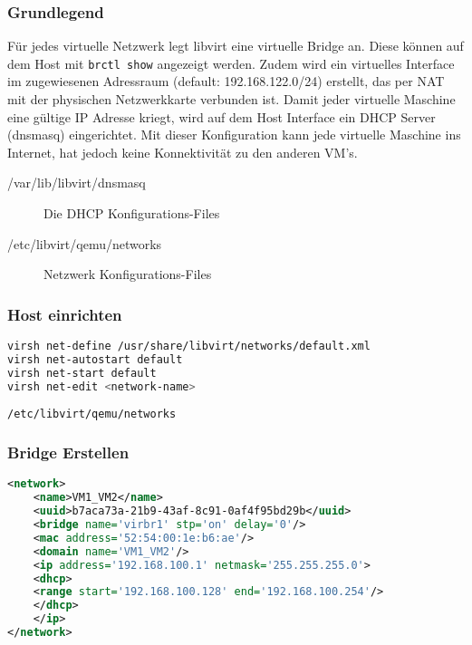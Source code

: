 \subsubsection{Grundlegend}
Für jedes virtuelle Netzwerk legt libvirt eine virtuelle Bridge an. Diese können auf dem Host mit \lstinline|brctl show| angezeigt werden. Zudem wird ein virtuelles Interface im zugewiesenen Adressraum (default: 192.168.122.0/24) erstellt, das per NAT mit der physischen Netzwerkkarte verbunden ist. Damit jeder virtuelle Maschine eine gültige IP Adresse kriegt, wird auf dem Host Interface ein DHCP Server (dnsmasq) eingerichtet. Mit dieser Konfiguration kann jede virtuelle Maschine ins Internet, hat jedoch keine Konnektivität zu den anderen VM's. 

\begin{description}
	\item[/var/lib/libvirt/dnsmasq] Die DHCP Konfigurations-Files 
	\item[/etc/libvirt/qemu/networks] Netzwerk Konfigurations-Files
\end{description}




\subsubsection{Host einrichten}
\begin{lstlisting}[language=bash]
virsh net-define /usr/share/libvirt/networks/default.xml
virsh net-autostart default
virsh net-start default
virsh net-edit <network-name>
\end{lstlisting}


\lstinline|/etc/libvirt/qemu/networks|

\subsubsection{Bridge Erstellen}
\begin{lstlisting}[language=xml]
<network>
	<name>VM1_VM2</name>
	<uuid>b7aca73a-21b9-43af-8c91-0af4f95bd29b</uuid>
	<bridge name='virbr1' stp='on' delay='0'/>
	<mac address='52:54:00:1e:b6:ae'/>
	<domain name='VM1_VM2'/>
	<ip address='192.168.100.1' netmask='255.255.255.0'>
	<dhcp>
	<range start='192.168.100.128' end='192.168.100.254'/>
	</dhcp>
	</ip>
</network>
\end{lstlisting}







